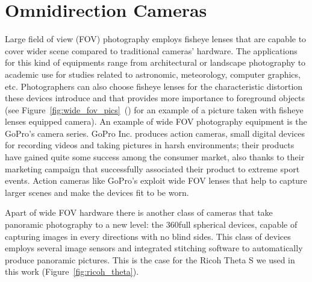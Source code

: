 \section{Omnidirection Cameras}
Large field of view (FOV) photography employs fisheye lenses that are capable to cover 
wider scene compared to traditional cameras' hardware.
The applications for this kind of equipments range from architectural or 
landscape photography to academic use for studies related to astronomic, 
meteorology, computer graphics, etc.
Photographers can also choose fisheye lenses for the characteristic distortion
these devices introduce and that provides more importance to foreground objects
(see Figure~\ref{fig:wide_fov_pics}~() for an 
example of a picture taken with fisheye lenses equipped camera).
An example of wide FOV photography equipment is the GoPro's camera series.
GoPro Inc. produces action cameras, small digital devices for recording videos 
and taking pictures in harsh environments; their products have gained quite 
some success among the consumer market, also thanks to their marketing campaign 
that successfully associated their product to extreme sport events.
Action cameras like GoPro's exploit wide FOV lenses that help to capture larger
scenes and make the devices fit to be worn.

Apart of wide FOV hardware there is another class of  
cameras that take panoramic photography to a new level: 
the 360\degree full spherical devices, capable of capturing images
in every directions with no blind sides. This class of devices employs 
several image sensors and integrated stitching software to automatically produce
panoramic pictures. This is the case for the Ricoh Theta S\texttrademark 
\cite{theta_website} we used in this work (Figure~\ref{fig:ricoh_theta}).

